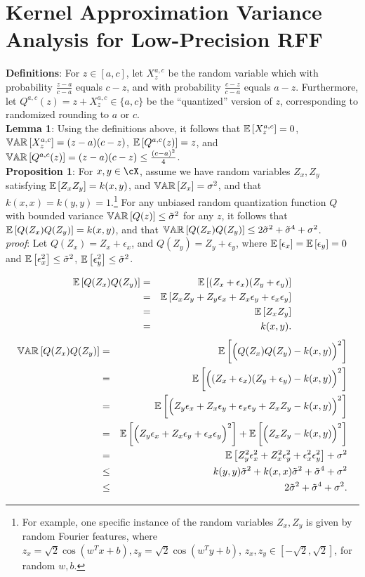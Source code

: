 \documentclass[12pt]{article}
\newcommand{\sq}{\sqrt{2}}
\newcommand{\eps}{\epsilon}
\newcommand{\tsigma}{\tilde{\sigma}}
\begin{document}
\section{Kernel Approximation Variance Analysis for Low-Precision RFF}
\noindent\textbf{Definitions}: For $z \in [a,c]$, let $X_z^{a,c}$ be the random variable which with probability $\frac{z-a}{c-a}$ equals $c-z$, and with probability $\frac{c-z}{c-a}$ equals $a-z$. Furthermore, let $Q^{a,c}(z) = z + X_z^{a,c} \in \{a,c\}$ be the ``quantized'' version of $z$, corresponding to randomized rounding to $a$ or $c$. \\

\noindent\textbf{Lemma 1}: Using the definitions above, it follows that $\expect{}{X_z^{a,c}} = 0$, $\var{}{X_z^{a,c}} = (z-a)(c-z)$, $\expect{}{Q^{a,c}(z)} = z$, and $\var{}{Q^{a,c}(z)} = (z-a)(c-z) \leq \frac{(c-a)^2}{4}$.\\

\noindent\textbf{Proposition 1}: For $x,y\in\cX$, assume we have random variables $Z_x,Z_y$ satisfying $\expect{}{Z_xZ_y} = k(x,y)$, and $\var{}{Z_x} = \sigma^2$, and that $k(x,x) = k(y,y) = 1$.\footnote{For example, one specific instance of the random variables $Z_x,Z_y$ is given by random Fourier features, where $z_x = \sq\cos(w^Tx+b),z_y = \sq\cos(w^Ty+b)$, $z_x,z_y\in[-\sq,\sq]$, for random $w,b$.}  For any unbiased random quantization function $Q$ with bounded variance $\var{}{Q(z)} \leq \tsigma^2$ for any $z$, it follows that $\expect{}{Q(Z_x)Q(Z_y)} = k(x,y)$, and that $\var{}{Q(Z_x)Q(Z_y)} \leq 2\tsigma^2 + \tsigma^4 + \sigma^2$.\\

\noindent\textit{proof}: Let $Q(Z_x) = Z_x + \eps_x$, and $Q(Z_y) = Z_y + \eps_y$, where $\expect{}{\eps_x} =\expect{}{\eps_y} = 0$ and $\expect{}{\eps_x^2} \leq \tsigma^2$, $\expect{}{\eps_y^2} \leq \tsigma^2$.

\begin{eqnarray*}
\expect{}{Q(Z_x)Q(Z_y)} &=& \expect{}{(Z_x + \eps_x)(Z_y + \eps_y)} \\
&=& \expect{}{Z_xZ_y + Z_y \eps_x + Z_x \eps_y + \eps_x \eps_y} \\
&=& \expect{}{Z_xZ_y} \\
&=& k(x,y).
\end{eqnarray*}
\begin{eqnarray*}
\var{}{Q(Z_x)Q(Z_y)} &=&  \expect{}{\Big(Q(Z_x)Q(Z_y) - k(x,y)\Big)^2} \\
&=& \expect{}{\Big((Z_x + \eps_x)(Z_y + \eps_y) - k(x,y)\Big)^2} \\
&=& \expect{}{\Big(Z_y \eps_x + Z_x\eps_y + \eps_x \eps_y +  Z_xZ_y - k(x,y)\Big)^2} \\
&=& \expect{}{\Big(Z_y \eps_x + Z_x\eps_y + \eps_x \eps_y\Big)^2} +  \expect{}{\Big(Z_xZ_y - k(x,y)\Big)^2} \\
&=& \expect{}{Z_y^2 \eps_x^2 + Z_x^2\eps_y^2 + \eps_x^2 \eps_y^2} +  \sigma^2 \\
&\leq& k(y,y) \tsigma^2 + k(x,x) \tsigma^2 + \tsigma^4 +  \sigma^2 \\
&\leq& 2\tsigma^2 + \tsigma^4 +  \sigma^2. 
\end{eqnarray*}
\end{document}

